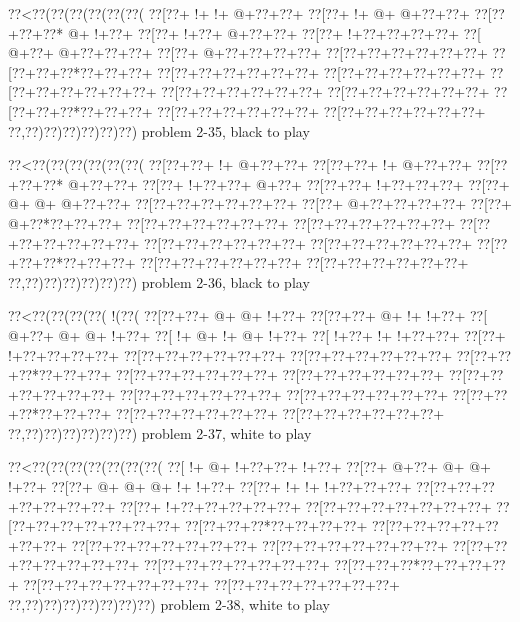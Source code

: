 \vbox{\vbox{\goo
\0??<\0??(\0??(\0??(\0??(\0??(\0??(
\0??[\0??+\- !+\- !+\- @+\0??+\0??+
\0??[\0??+\- !+\- @+\- @+\0??+\0??+
\0??[\0??+\0??+\0??*\- @+\- !+\0??+
\0??[\0??+\- !+\0??+\- @+\0??+\0??+
\0??[\0??+\- !+\0??+\0??+\0??+\0??+
\0??[\- @+\0??+\- @+\0??+\0??+\0??+
\0??[\0??+\- @+\0??+\0??+\0??+\0??+
\0??[\0??+\0??+\0??+\0??+\0??+\0??+
\0??[\0??+\0??+\0??*\0??+\0??+\0??+
\0??[\0??+\0??+\0??+\0??+\0??+\0??+
\0??[\0??+\0??+\0??+\0??+\0??+\0??+
\0??[\0??+\0??+\0??+\0??+\0??+\0??+
\0??[\0??+\0??+\0??+\0??+\0??+\0??+
\0??[\0??+\0??+\0??+\0??+\0??+\0??+
\0??[\0??+\0??+\0??*\0??+\0??+\0??+
\0??[\0??+\0??+\0??+\0??+\0??+\0??+
\0??[\0??+\0??+\0??+\0??+\0??+\0??+
\0??,\0??)\0??)\0??)\0??)\0??)\0??)
}
\hfil problem 2-35, black to play\hfil\break
}

\vbox{\vbox{\goo
\0??<\0??(\0??(\0??(\0??(\0??(\0??(
\0??[\0??+\0??+\- !+\- @+\0??+\0??+
\0??[\0??+\0??+\- !+\- @+\0??+\0??+
\0??[\0??+\0??+\0??*\- @+\0??+\0??+
\0??[\0??+\- !+\0??+\0??+\- @+\0??+
\0??[\0??+\0??+\- !+\0??+\0??+\0??+
\0??[\0??+\- @+\- @+\- @+\0??+\0??+
\0??[\0??+\0??+\0??+\0??+\0??+\0??+
\0??[\0??+\- @+\0??+\0??+\0??+\0??+
\0??[\0??+\- @+\0??*\0??+\0??+\0??+
\0??[\0??+\0??+\0??+\0??+\0??+\0??+
\0??[\0??+\0??+\0??+\0??+\0??+\0??+
\0??[\0??+\0??+\0??+\0??+\0??+\0??+
\0??[\0??+\0??+\0??+\0??+\0??+\0??+
\0??[\0??+\0??+\0??+\0??+\0??+\0??+
\0??[\0??+\0??+\0??*\0??+\0??+\0??+
\0??[\0??+\0??+\0??+\0??+\0??+\0??+
\0??[\0??+\0??+\0??+\0??+\0??+\0??+
\0??,\0??)\0??)\0??)\0??)\0??)\0??)
}
\hfil problem 2-36, black to play\hfil\break
}

\vbox{\vbox{\goo
\0??<\0??(\0??(\0??(\0??(\- !(\0??(
\0??[\0??+\0??+\- @+\- @+\- !+\0??+
\0??[\0??+\0??+\- @+\- !+\- !+\0??+
\0??[\- @+\0??+\- @+\- @+\- !+\0??+
\0??[\- !+\- @+\- !+\- @+\- !+\0??+
\0??[\- !+\0??+\- !+\- !+\0??+\0??+
\0??[\0??+\- !+\0??+\0??+\0??+\0??+
\0??[\0??+\0??+\0??+\0??+\0??+\0??+
\0??[\0??+\0??+\0??+\0??+\0??+\0??+
\0??[\0??+\0??+\0??*\0??+\0??+\0??+
\0??[\0??+\0??+\0??+\0??+\0??+\0??+
\0??[\0??+\0??+\0??+\0??+\0??+\0??+
\0??[\0??+\0??+\0??+\0??+\0??+\0??+
\0??[\0??+\0??+\0??+\0??+\0??+\0??+
\0??[\0??+\0??+\0??+\0??+\0??+\0??+
\0??[\0??+\0??+\0??*\0??+\0??+\0??+
\0??[\0??+\0??+\0??+\0??+\0??+\0??+
\0??[\0??+\0??+\0??+\0??+\0??+\0??+
\0??,\0??)\0??)\0??)\0??)\0??)\0??)
}
\hfil problem 2-37, white to play\hfil\break
}

\vbox{\vbox{\goo
\0??<\0??(\0??(\0??(\0??(\0??(\0??(\0??(
\0??[\- !+\- @+\- !+\0??+\0??+\- !+\0??+
\0??[\0??+\- @+\0??+\- @+\- @+\- !+\0??+
\0??[\0??+\- @+\- @+\- @+\- !+\- !+\0??+
\0??[\0??+\- !+\- !+\- !+\0??+\0??+\0??+
\0??[\0??+\0??+\0??+\0??+\0??+\0??+\0??+
\0??[\0??+\- !+\0??+\0??+\0??+\0??+\0??+
\0??[\0??+\0??+\0??+\0??+\0??+\0??+\0??+
\0??[\0??+\0??+\0??+\0??+\0??+\0??+\0??+
\0??[\0??+\0??+\0??*\0??+\0??+\0??+\0??+
\0??[\0??+\0??+\0??+\0??+\0??+\0??+\0??+
\0??[\0??+\0??+\0??+\0??+\0??+\0??+\0??+
\0??[\0??+\0??+\0??+\0??+\0??+\0??+\0??+
\0??[\0??+\0??+\0??+\0??+\0??+\0??+\0??+
\0??[\0??+\0??+\0??+\0??+\0??+\0??+\0??+
\0??[\0??+\0??+\0??*\0??+\0??+\0??+\0??+
\0??[\0??+\0??+\0??+\0??+\0??+\0??+\0??+
\0??[\0??+\0??+\0??+\0??+\0??+\0??+\0??+
\0??,\0??)\0??)\0??)\0??)\0??)\0??)\0??)
}
\hfil problem 2-38, white to play\hfil\break
}

